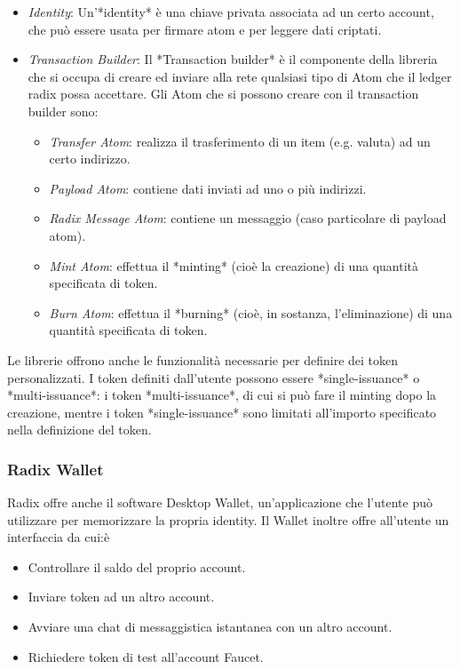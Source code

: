 \begin{itemize}
    \item \textit{Identity}: Un'*identity* è una chiave privata associata ad un certo account, che può essere usata per firmare atom e per leggere dati criptati.
    \item \textit{Transaction Builder}: Il *Transaction builder* è il componente della libreria che si occupa di creare ed inviare alla rete qualsiasi tipo di Atom che il ledger radix possa accettare. Gli Atom che si possono creare con il transaction builder sono:
    \begin{itemize}
        \item \textit{Transfer Atom}: realizza il trasferimento di un item (e.g. valuta) ad un certo indirizzo.
        \item \textit{Payload Atom}: contiene dati inviati ad uno o più indirizzi.
        \item \textit{Radix Message Atom}: contiene un messaggio (caso particolare di payload atom).
        \item \textit{Mint Atom}: effettua il *minting* (cioè la creazione) di una quantità specificata di token.
        \item \textit{Burn Atom}: effettua il *burning* (cioè, in sostanza, l'eliminazione) di una quantità specificata di token.
    \end{itemize}
\end{itemize}
Le librerie offrono anche le funzionalità necessarie per definire dei token personalizzati. I token definiti dall'utente possono essere *single-issuance* o *multi-issuance*: i token *multi-issuance*, di cui si può fare il minting dopo la creazione, mentre i token *single-issuance* sono limitati all'importo specificato nella definizione del token.

\subsubsection{Radix Wallet}

Radix offre anche il software Desktop Wallet, un'applicazione che l'utente può utilizzare per memorizzare la propria identity. Il Wallet inoltre offre all'utente un interfaccia da cui:è
\begin{itemize}
    \item Controllare il saldo del proprio account.
    \item Inviare token ad un altro account.
    \item Avviare una chat di messaggistica istantanea con un altro account.
    \item Richiedere token di test all'account Faucet.
\end{itemize}